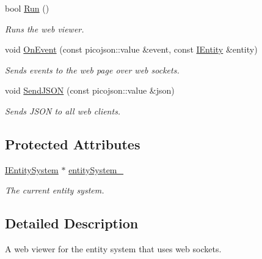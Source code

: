\begin{DoxyCompactItemize}
bool \hyperlink{classentity__project_1_1WebSceneViewer_a60b5a903167b43ff350cee71c313707b}{Run} ()
\begin{DoxyCompactList}\small\item\em Runs the web viewer. \end{DoxyCompactList}\item 
\mbox{\label{classentity__project_1_1WebSceneViewer_a2b585b5b2edf6ad8b09689839556eb8a}} 
void \hyperlink{classentity__project_1_1WebSceneViewer_a2b585b5b2edf6ad8b09689839556eb8a}{On\+Event} (const picojson\+::value \&event, const \hyperlink{classentity__project_1_1IEntity}{I\+Entity} \&entity)
\begin{DoxyCompactList}\small\item\em Sends events to the web page over web sockets. \end{DoxyCompactList}\item 
\mbox{\label{classentity__project_1_1WebSceneViewer_ad646d66fcd60ddddf86e0a960beb2d1a}} 
void \hyperlink{classentity__project_1_1WebSceneViewer_ad646d66fcd60ddddf86e0a960beb2d1a}{Send\+J\+S\+ON} (const picojson\+::value \&json)
\begin{DoxyCompactList}\small\item\em Sends J\+S\+ON to all web clients. \end{DoxyCompactList}\end{DoxyCompactItemize}
\subsection*{Protected Attributes}
\begin{DoxyCompactItemize}
\item 
\mbox{\label{classentity__project_1_1WebSceneViewer_a1600473b4e8290d50d5a430360636c0f}} 
\hyperlink{classentity__project_1_1IEntitySystem}{I\+Entity\+System} $\ast$ \hyperlink{classentity__project_1_1WebSceneViewer_a1600473b4e8290d50d5a430360636c0f}{entity\+System\+\_\+}
\begin{DoxyCompactList}\small\item\em The current entity system. \end{DoxyCompactList}\end{DoxyCompactItemize}


\subsection{Detailed Description}
A web viewer for the entity system that uses web sockets. 

